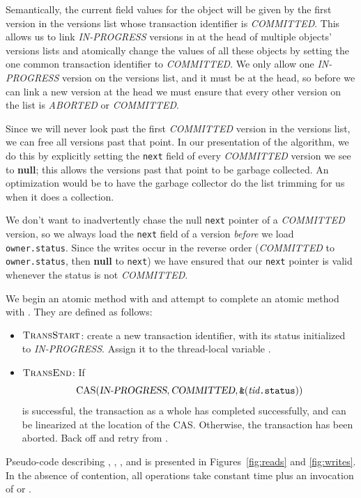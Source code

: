 Semantically, the current field values for the object will be given by
the first version in 
the versions list whose transaction identifier is {\sl COMMITTED}.
This allows us to link {\sl IN-PROGRESS} versions in at the head of
multiple objects' versions lists and atomically change the values of
all these objects by setting the one common transaction identifier to
{\sl COMMITTED}.  We only allow one {\sl IN-PROGRESS} version on the
versions list, and it must be at the head, so
before we can link a new version at the head we
must ensure that every other version on the list is {\sl ABORTED} or
{\sl COMMITTED}.

Since we will never look past the first {\sl COMMITTED} version in the
versions list, we can free all versions past that point.  In our
presentation of the algorithm, we do this by explicitly setting the
{\tt next} field of every {\sl COMMITTED} version we see to {\bf null};
this allows the versions past that point to be garbage collected.
An optimization would be to have the garbage collector do the list
trimming for us when it does a collection.

We don't want to inadvertently chase the null {\tt next} pointer
of a {\sl COMMITTED} version, so we always load the {\tt next}
field of a version \emph{before} we load {\tt owner.status}.  Since
the writes occur in the reverse order ({\sl COMMITTED} to
{\tt owner.status}, then {\bf null} to {\tt next}) we have ensured that
our {\tt next} pointer is valid whenever the status is not {\sl COMMITTED}.

We begin an atomic method with  and attempt to
complete an atomic method with .  They are defined as
follows:
\begin{itemize}
\item $\text{\sc TransStart}$: create a new transaction identifier, with
  its status initialized to {\sl IN-PROGRESS}.  Assign it to the
  thread-local variable .
\item $\text{\sc TransEnd}$:
  If
 $$\text{CAS}(\text{\sl IN-PROGRESS}, \text{\sl COMMITTED},
             \text{\tt \&}(\text{\it tid}\text{\tt .status}))$$
  is successful, the transaction as a whole has completed successfully,
  and can be linearized at the location of the CAS.
  Otherwise, the transaction has been aborted.  Back off and retry from
  .
\end{itemize}
Pseudo-code describing , , ,
and  is presented in Figures~\ref{fig:reads} and
\ref{fig:writes}.  In the absence of contention, all operations take
constant time plus an invocation of  or
.

